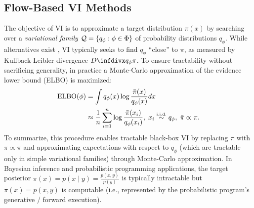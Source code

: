 \documentclass[thesis.tex]{subfiles}
\begin{document}

\vspace{-2mm}
\subsection{Flow-Based VI Methods} 

The objective of VI is to approximate a target distribution $\pi(x)$ by searching over
a \emph{variational family} $\mathcal{Q} = \{q_\phi : \phi \in \Phi\}$ of probability distributions $q_\phi$.
While alternatives exist \citep{li2016variational,wang2018variational}, VI typically
seeks to find $q_\phi$ ``close'' to $\pi$, as measured by Kullback-Leibler divergence $\infdiv{q_\phi}{\pi}$.
To ensure tractability without sacrificing generality, in practice \citep{wingate2013automated,ranganath2014black}
a Monte-Carlo approximation of the evidence lower bound (ELBO) is maximized:
\begin{align*}
  \text{ELBO}(\phi)
  &= \int q_\phi(x) \log \frac{\bar\pi(x)}{q_\phi(x)} dx\\
  & \approx \frac{1}{n} \sum_{i=1}^n \log \frac{\bar\pi(x_i)}{q_\phi(x_i)},\;
  x_i \simiid q_\phi,\;
  \bar{\pi} \propto \pi. 
\end{align*}
To summarize, this procedure enables tractable black-box VI
by replacing $\pi$ with $\bar\pi \propto \pi$ and approximating expectations with respect to $q_\phi$ (which are tractable only in simple variational families) through Monte-Carlo approximation. In Bayesian inference and probabilistic programming applications, the target posterior
$\pi(x) = p(x \mid y) = \frac{p(x, y)}{p(y)}$ is typically intractable but
$\bar\pi(x) = p(x,y)$ is computable (i.e., represented by the probabilistic program's
generative / forward execution).
\end{document}
